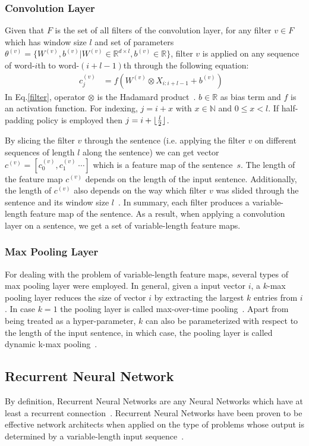 \subsubsection{Convolution Layer}\label{conv-layer}
Given that \(F\) is the set of all filters of the convolution layer, for any filter \(v \in F\) which has window size \(l\) and set of parameters \(\theta^{(v)} = \{ W^{(v)}, b^{(v)} | W^{(v)} \in \mathbb{R}^{d \times l}, b^{(v)} \in \mathbb{R}\}\), filter \({v}\) is applied on any sequence of word-\(i\)th to word-\((i+l-1)\)th through the following equation:
\begin{align}
c^{(v)}_j &= f(W^{(v)} \otimes X_{i:i+l-1} + b^{(v)}) &\label{filter}
\end{align}
In Eq.\eqref{filter}, operator \(\otimes\) is the Hadamard product~\cite{element-prod}.
\(b \in \mathbb{R}\) as bias term and \(f\) is an activation function.
For indexing, \(j = i + x\) with \(x \in \mathbb{N}\) and \(0 \leq x < l\).
If half-padding policy is employed then \(j = i + \lfloor \frac{l}{2} \rfloor\).

By slicing the filter \(v\) through the sentence (i.e. applying the filter \(v\) on different sequences of length \(l\) along the sentence) we can get vector \(c^{(v)} = [c^{(v)}_0, c^{(v)}_1~\cdots]\) which is a feature map of the sentence~\(s\).
The length of the feature map \(c^{(v)}\) depends on the length of the input sentence.
Additionally, the length of \(c^{(v)}\) also depends on the way which filter \(v\) was slided through the sentence and its window size \(l\)~\cite{conv-arith}.
In summary, each filter produces a variable-length feature map of the sentence.
As a result, when applying a convolution layer on a sentence, we get a set of variable-length feature maps.
\subsubsection{Max Pooling Layer}
For dealing with the problem of variable-length feature maps, several types of max pooling layer were employed.
In general, given a input vector \(i\), a \(k\)-max pooling layer reduces the size of vector \(i\) by extracting the largest \(k\) entries from \(i\).
In case \(k = 1\) the pooling layer is called max-over-time pooling~\cite{nlp-scratch,KimCNN}.
Apart from being treated as a hyper-parameter, \(k\) can also be parameterized with respect to the length of the input sentence, in which case, the pooling layer is called dynamic k-max pooling~\cite{DCNN}.
\subsection{Recurrent Neural Network}
By definition, Recurrent Neural Networks are any Neural Networks which have at least a recurrent connection~\cite{rnn-def}.
Recurrent Neural Networks have been proven to be effective network architects when applied on the type of problems whose output is determined by a variable-length input sequence~\cite{speech-lstm,SutskeverVL14,mikolov-nlm}.
